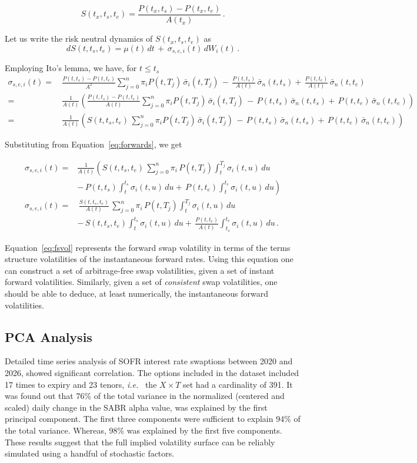 \documentclass[12pt,oneside]{article}
\newcommand{\beqn}{\begin{equation}}
\newcommand{\eeqn}{\end{equation}}
\numberwithin{equation}{section}
\newcommand{\ie}{{\em i.e.}\ }
\begin{document}
\beqn
S(t_x,t_s,t_e)=\frac{P(t_x,t_s)-P(t_x,t_e)}{A(t_x)}\,.
\eeqn

Let us write the risk neutral dynamics of $S(t_x,t_s,t_e)$ as
\beqn
dS(t,t_s,t_e)=\mu(t)\,dt\,+\,\sigma_{s,e,i}(t)\,dW_i(t)\,.
\eeqn

Employing Ito's lemma, we have, for $t\le t_s$
\beqn
\begin{aligned}
\sigma_{s,e,i}(t)=&\,\frac{P(t,t_s)-P(t,t_e)}{A^2}\sum_{j=0}^n\pi_i P(t,T_j)\,\bar{\sigma}_i(t,T_j)\,
-\,\frac{P(t,t_s)}{A(t)}\,\bar{\sigma}_n(t,t_s)+\,\frac{P(t,t_e)}{A(t)}\,\bar{\sigma}_n(t,t_e)\\[12.5pt]
=&\,\frac{1}{A(t)}\left(\frac{P(t,t_s)-P(t,t_e)}{A(t)}\sum_{j=0}^n\pi_i P(t,T_j)\,\bar{\sigma}_i(t,T_j)\,
-\,P(t,t_s)\,\bar{\sigma}_n(t,t_s)+\,P(t,t_e)\,\bar{\sigma}_n(t,t_e)\right)\\[12.5pt]
=&\,\frac{1}{A(t)}\left(S(t,t_s,t_e)\,\sum_{j=0}^n\pi_i P(t,T_j)\,\bar{\sigma}_i(t,T_j)\,
-\,P(t,t_s)\,\bar{\sigma}_n(t,t_s)+\,P(t,t_e)\,\bar{\sigma}_n(t,t_e)\right)
\end{aligned}
\eeqn

Substituting from Equation~\eqref{eq:forwards}, we get

\beqn\label{eq:fsvol}
\begin{aligned}
\sigma_{s,e,i}(t)=&\frac{1}{A(t)}\left(S(t,t_s,t_e)\,\sum_{j=0}^n\pi_i\, P(t,T_j)\int_t^{T_j}\sigma_i(t,u)\, du\right.\\
&-\left.\,P(t,t_s)\int_t^{t_s}\sigma_i(t,u)\,du+\,P(t,t_e)\int_t^{t_e}\sigma_i(t,u)\,du\right)\\
\sigma_{s,e,i}(t)=&\,\frac{S(t,t_s,t_e)}{A(t)}\,\sum_{j=0}^n\pi_i\, P(t,T_j)\int_t^{T_j}\sigma_i(t,u)\, du\\
&-\,S(t,t_s,t_e)\int_t^{t_s}\sigma_i(t,u)\,du+\,\frac{P(t,t_e)}{A(t)}\int_{t_s}^{t_e}\sigma_i(t,u)\,du\,.
\end{aligned}
\eeqn

Equation~\eqref{eq:fsvol} represents the forward swap volatility in terms of the terms
structure volatilities of the instantaneous forward rates.
Using this equation one can construct a set of arbitrage-free swap volatilities,
given a set of instant forward volatilities.
Similarly, given a set of {\em consistent} swap volatilities, one should be able to deduce,
at least numerically, the
instantaneous forward volatilities.

\subsection{PCA Analysis}
Detailed time series analysis of SOFR interest rate swaptions between 2020 and 2026, showed significant correlation.
The options included in the dataset included 17 times to expiry and 23 tenors, \ie
the $X\times T$ set had a cardinality of 391.
It was found out that 76\% of the total variance in the
normalized (centered and scaled) daily change in the SABR alpha value, was explained by the first principal component.
The first three components were sufficient to explain 94\% of the total variance.
Whereas, 98\% was explained by the first five components.
These results suggest that the full implied volatility surface can
be reliably simulated using a handful of stochastic factors.
\end{document}
